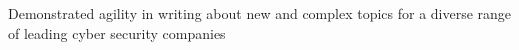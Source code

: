 \item Demonstrated agility in writing about new and complex topics for a diverse range of leading cyber security companies